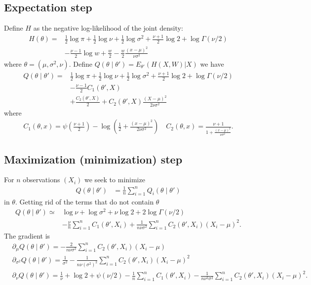 \documentclass[a4paper,12pt]{article}
\begin{document}
\subsection{Expectation step}
Define $H$ as the negative log-likelihood of the joint density:
\begin{align*}
    H(\theta)=&\frac{1}{2}\log \pi
        +\frac{1}{2}\log\nu
        +\frac{1}{2}\log\sigma^2
        +\frac{\nu + 1}{2}\log 2
        +\log\Gamma(\nu / 2)\\
        &-\frac{\nu - 1}{2}\log w 
        +\frac{w}{2}- \frac{w}{2}\frac{(x - \mu)^2}{\nu\sigma^2}
\end{align*}
where $\theta = (\mu, \sigma^2, \nu)$. Define $Q(\theta \mid \theta')=E_{\theta'}(H(X, W) | X)$ we have
\begin{align*}
    Q(\theta \mid \theta')=&\frac{1}{2}\log \pi
    +\frac{1}{2}\log\nu
    +\frac{1}{2}\log\sigma^2
    +\frac{\nu + 1}{2}\log 2
    +\log\Gamma(\nu / 2)\\
    &-\frac{\nu - 1}{2}C_{1}(\theta', X)\\
    &+\frac{C_{2}(\theta', X)}{2}
    +C_{2}(\theta', X)\frac{(X - \mu)^2}{2\nu\sigma^2}
\end{align*}
where
\begin{align*}
    C_{1}(\theta, x) = \psi\left(\frac{\nu + 1}{2}\right)-\log\left(\frac{1}{2}+\frac{(x - \mu)^2}{2\nu\sigma^2}\right) \quad 
    C_{2}(\theta, x) = \frac{\nu + 1}{1+\frac{(x -\mu)^2}{\nu\sigma^2}}.
\end{align*}
\subsection{Maximization (minimization) step}
For $n$ observations $(X_{i})$ we seek to minimize
\begin{align*}
    Q(\theta\mid\theta')&=\frac{1}{n}\sum_{i=1}^{n}Q_{i}(\theta\mid\theta')
\end{align*}
in $\theta$. Getting rid of the terms that do not contain $\theta$
\begin{align*}
    Q(\theta\mid\theta')\simeq
        &\log\nu
        + \log\sigma^2
        + \nu\log 2
        + 2\log\Gamma(\nu / 2)\\
        &- \frac{\nu}{n}\sum_{i=1}^{n}C_{1}(\theta', X_{i})+\frac{1}{n\nu\sigma^2}\sum_{i=1}^{n}C_{2}(\theta', X_{i})(X_{i}-\mu)^2.
\end{align*}
The gradient is
\begin{align*}
    &\partial_{\mu}Q(\theta\mid\theta') = -\frac{2}{n\nu\sigma^2}\sum_{i=1}^{n}C_{2}(\theta', X_{i})(X_{i}-\mu)\\
    &\partial_{\sigma^2}Q(\theta\mid\theta') = \frac{1}{\sigma^2}-\frac{1}{n\nu(\sigma^2)^{2}}\sum_{i=1}^{n}C_{2}(\theta', X_{i})(X_{i}-\mu)^2\\
    &\partial_{\nu}Q(\theta\mid\theta') = \frac{1}{\nu}
        +\log 2 
        +\psi(\nu / 2)
        -\frac{1}{n}\sum_{i=1}^{n}C_{1}(\theta', X_{i})
        -\frac{1}{n\nu^2\sigma^2}\sum_{i=1}^{n}C_{2}(\theta', X_{i})(X_{i}-\mu)^2.
\end{align*}
\end{document}
